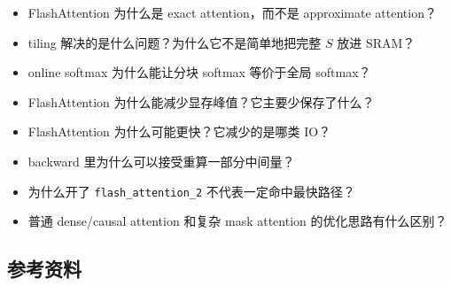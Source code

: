 \begin{itemize}[leftmargin=1.5em]
  \item FlashAttention 为什么是 exact attention，而不是 approximate attention？
  \item tiling 解决的是什么问题？为什么它不是简单地把完整 $S$ 放进 SRAM？
  \item online softmax 为什么能让分块 softmax 等价于全局 softmax？
  \item FlashAttention 为什么能减少显存峰值？它主要少保存了什么？
  \item FlashAttention 为什么可能更快？它减少的是哪类 IO？
  \item backward 里为什么可以接受重算一部分中间量？
  \item 为什么开了 \texttt{flash\_attention\_2} 不代表一定命中最快路径？
  \item 普通 dense/causal attention 和复杂 mask attention 的优化思路有什么区别？
\end{itemize}

\subsection{参考资料}

